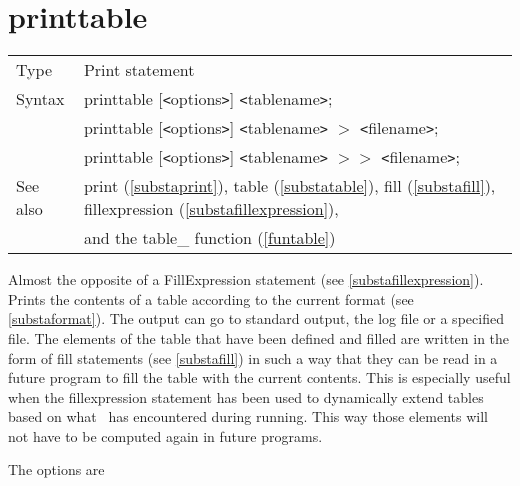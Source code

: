 
\section{printtable}
\label{substaprinttable}

\noindent \begin{tabular}{ll}
Type & Print statement\\
Syntax & printtable [{\tt<}options{\tt>}] {\tt<}tablename{\tt>};  \\
       & printtable [{\tt<}options{\tt>}] {\tt<}tablename{\tt>} $>$ {\tt<}filename{\tt>}; \\
       & printtable [{\tt<}options{\tt>}] {\tt<}tablename{\tt>} $>\!\!>$ {\tt<}filename{\tt>};
\\ See also & print (\ref{substaprint}),
            table (\ref{substatable}),
            fill (\ref{substafill}),
            fillexpression (\ref{substafillexpression}), \\ &
            and the table\_ function (\ref{funtable})
\end{tabular}\vspace{4mm}

\noindent Almost the opposite of a 
FillExpression statement (see 
\ref{substafillexpression}). Prints the contents of a 
table according to the current format (see 
\ref{substaformat}). The output can go to standard output, the 
log file or a specified file. The elements of 
the table that have been defined and filled are written in the form of 
fill statements (see \ref{substafill}) in such a way that they 
can be read in a future program to fill the table with the current 
contents. This is especially useful when the fillexpression statement has 
been used to dynamically extend tables based on what \FORM\ has encountered 
during running. This way those elements will not have to be computed again 
in future programs. 

\noindent The options are




